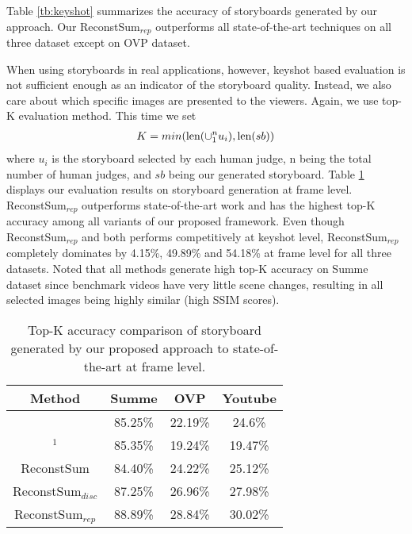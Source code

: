 \documentclass[5pt]{article}
\begin{document}
Table \ref{tb:keyshot} summarizes the accuracy of storyboards generated by our approach. Our ReconstSum$_{rep}$ outperforms all state-of-the-art techniques on all three dataset except \cite{mahasseni2017unsupervised} on OVP dataset. 

When using storyboards in real applications, however, keyshot based evaluation is not sufficient enough as an indicator of the storyboard quality. Instead, we also care about which specific images are presented to the viewers. Again, we use top-K evaluation method. This time we set 
\begin{eqnarray}
K = min(\textnormal{len}(\cup_1^n u_i), \textnormal{len}(sb))
\label{eq:K}
\end{eqnarray}
where $u_i$ is the storyboard selected by each human judge, n being the total number of human judges, and $sb$ being our generated storyboard. Table \ref{tb:topk} displays our evaluation results on storyboard generation at frame level. ReconstSum$_{rep}$ outperforms state-of-the-art work and has the highest top-K accuracy among all variants of our proposed framework. Even though ReconstSum$_{rep}$ and \cite{mahasseni2017unsupervised} both performs competitively at keyshot level, ReconstSum$_{rep}$ completely dominates \cite{mahasseni2017unsupervised} by 4.15\%, 49.89\% and 54.18\% at frame level for all three datasets. Noted that all methods generate high top-K accuracy on Summe dataset since benchmark videos have very little scene changes, resulting in all selected images being highly similar (high SSIM scores).

\begin{table}[t]
\begin{center}
\caption{Top-K accuracy comparison of storyboard generated by our proposed approach to state-of-the-art at frame level. } 
\begin{tabular}{|c|c|c|c|}
  \hline
  Method & Summe & OVP & Youtube\\
  \hline
  \cite{Avila} & 85.25\%  &  22.19\% & 24.6\% \\
  \cite{mahasseni2017unsupervised}$^1$ & 85.35\% & 19.24\%  & 19.47\%  \\
  ReconstSum &  84.40\% &  24.22\% & 25.12\% \\
  ReconstSum$_{disc}$ &  87.25\% &  26.96\% & 27.98\% \\
  ReconstSum$_{rep}$ &  88.89\% &  28.84\% & 30.02\% \\
  \hline
\end{tabular}
\label{tb:topk}
\end{center}
\end{table}
\end{document}
